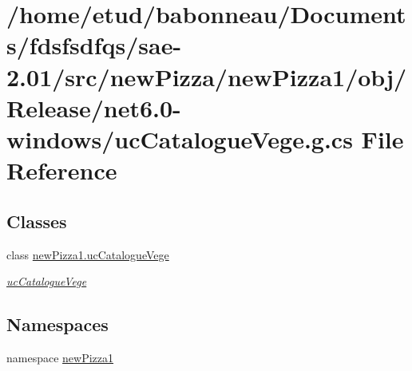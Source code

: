 \hypertarget{Release_2net6_80-windows_2ucCatalogueVege_8g_8cs}{}\section{/home/etud/babonneau/\+Documents/fdsfsdfqs/sae-\/2.01/src/new\+Pizza/new\+Pizza1/obj/\+Release/net6.0-\/windows/uc\+Catalogue\+Vege.g.\+cs File Reference}
\label{Release_2net6_80-windows_2ucCatalogueVege_8g_8cs}
\subsection*{Classes}
\begin{DoxyCompactItemize}
\item 
class \hyperlink{classnewPizza1_1_1ucCatalogueVege}{new\+Pizza1.\+uc\+Catalogue\+Vege}
\begin{DoxyCompactList}\small\item\em \hyperlink{classnewPizza1_1_1ucCatalogueVege}{uc\+Catalogue\+Vege} \end{DoxyCompactList}\end{DoxyCompactItemize}
\subsection*{Namespaces}
\begin{DoxyCompactItemize}
\item 
namespace \hyperlink{namespacenewPizza1}{new\+Pizza1}
\end{DoxyCompactItemize}
